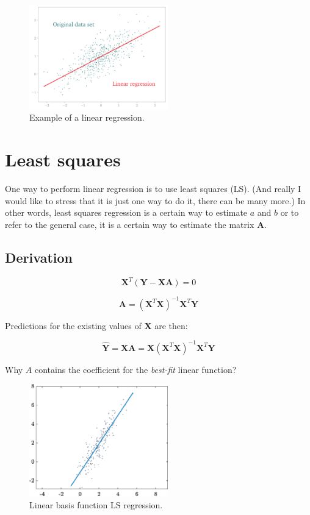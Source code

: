 \documentclass[10pt,twocolumn]{article}
\begin{document}
\begin{figure}[H]
\centering\includegraphics[width=6cm]{linear-regression.png}
\caption{Example of a linear regression.}
\label{fig:linear-regression-demo}
\end{figure}



\section{Least squares}

One way to perform linear regression is to use least squares (LS). (And really I would like to stress that it is just one way to do it, there can be many more.) In other words, least squares regression is a certain way to estimate $a$ and $b$ or to refer to the general case, it is a certain way to estimate the matrix $\bm{A}$.


\subsection{Derivation}

\begin{equation}
\bm{X}^T (\bm{Y} - \bm{X} \bm{A}) = 0
\end{equation}



\begin{equation}
\bm{A} = (\bm{X}^T \bm{X})^{-1} \bm{X}^T \bm{Y}
\end{equation}

Predictions for the existing values of $\bm{X}$ are then:

\begin{equation}
\bm{\hat{Y}} = \bm{X} \bm{A} = \bm{X} (\bm{X}^T \bm{X})^{-1} \bm{X}^T \bm{Y}
\end{equation}



Why $A$ contains the coefficient for the \textit{best-fit} linear function?




\begin{figure}[H]
\centering\includegraphics[width=6cm]{LS-linear-basis-functions.eps}
\caption{Linear basis function LS regression.}
\label{fig:LS-linear-basis}
\end{figure}
\end{document}
